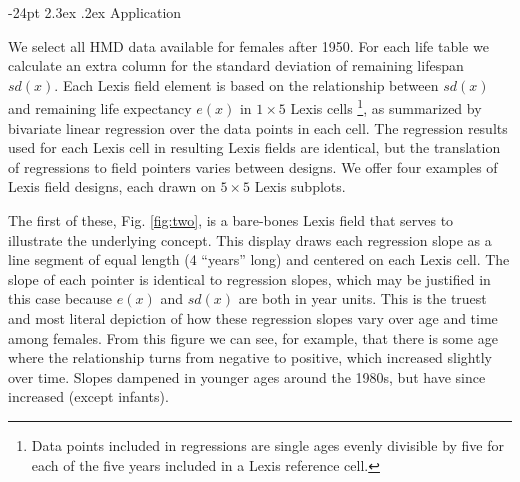 \documentclass[10pt, twoside, parskip=half]{article}
\makeatletter
\renewcommand\section{\@startsection {section}{1}{\z@}%
                                   {-24pt}%
                                   {2.3ex \@plus.2ex}%
                                   {\normalfont\large\bfseries}}
\makeatother
\begin{document}
\hypertarget{application}{%
\section{Application}\label{application}}

We select all HMD data available for females after 1950. For each life table we calculate an extra column for the standard deviation of remaining lifespan \(sd(x)\). Each Lexis field element is based on the relationship between \(sd(x)\) and remaining life expectancy \(e(x)\) in \(1\times 5\) Lexis cells \footnote{Data points included in regressions are single ages evenly divisible by five for each of the five years included in a Lexis reference cell.}, as summarized by bivariate linear regression over the data points in each cell. The regression results used for each Lexis cell in resulting Lexis fields are identical, but the translation of regressions to field pointers varies between designs. We offer four examples of Lexis field designs, each drawn on \(5\times 5\) Lexis subplots.

The first of these, Fig. \ref{fig:two}, is a bare-bones Lexis field that serves to illustrate the underlying concept. This display draws each regression slope as a line segment of equal length (4 ``years'' long) and centered on each Lexis cell. The slope of each pointer is identical to regression slopes, which may be justified in this case because \(e(x)\) and \(sd(x)\) are both in year units. This is the truest and most literal depiction of how these regression slopes vary over age and time among females. From this figure we can see, for example, that there is some age where the relationship turns from negative to positive, which increased slightly over time. Slopes dampened in younger ages around the 1980s, but have since increased (except infants).
\end{document}
